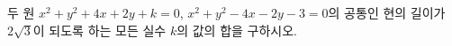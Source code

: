두 원 $x^2+y^2+4x+2y+k=0$, $x^2+y^2-4x-2y-3=0$의 공통인 현의 길이가 $2\sqrt{3}$이 되도록 하는 모든 실수 $k$의 값의 합을 구하시오.
